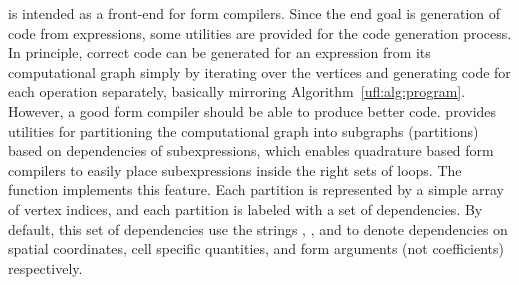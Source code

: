 \ufl{} is intended as a front-end for form compilers.  Since the end
goal is generation of code from expressions, some utilities are
provided for the code generation process. In principle, correct code
can be generated for an expression from its computational graph simply
by iterating over the vertices and generating code for each operation
separately, basically mirroring Algorithm~\ref{ufl:alg:program}.
However, a good form compiler should be able to produce better code.
\ufl{} provides utilities for partitioning the computational graph
into subgraphs (partitions) based on dependencies of subexpressions,
which enables quadrature based form compilers to easily place
subexpressions inside the right sets of loops. The function
 implements this feature.  Each partition is
represented by a simple array of vertex indices, and each partition is
labeled with a set of dependencies. By default, this set of
dependencies use the strings , , and  to
denote dependencies on spatial coordinates, cell specific quantities,
and form arguments (not coefficients) respectively.

